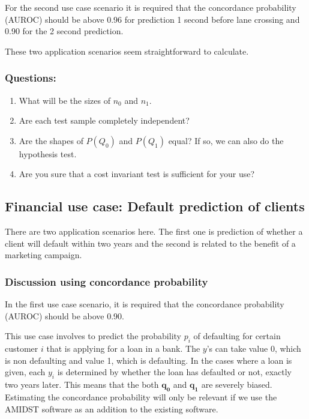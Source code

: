 \documentclass{article}
\theoremstyle{theorem}
\theoremstyle{definition}
\newcommand{\bv}[1]{\bm{#1}}
\begin{document}
For the second use case scenario it is required that the concordance probability (AUROC) should be above 0.96 for prediction 1 second before lane crossing and 0.90 for the 2 second prediction.

These two application scenarios seem straightforward to calculate.

\subsubsection*{Questions: }
\begin{enumerate}
\item What will be the sizes of $n_0$ and $n_1$.
\item Are each test sample completely independent?
\item Are the shapes of $P(Q_0)$ and $P(Q_1)$ equal? If so, we can also do the hypothesis test.
\item Are you sure that a cost invariant test is sufficient for your use?
\end{enumerate}


\subsection{Financial use case: Default prediction of clients}
\label{sec:financial}

There are two application scenarios here.  The first one is prediction of whether a client will default within two years and the second is related to the benefit of a marketing campaign.

\subsubsection*{Discussion using concordance probability}

In the first use case scenario, it is required that the concordance probability (AUROC) should be above 0.90.

This use case involves to predict the probability $p_i$ of defaulting for certain customer $i$ that is applying for a loan in a bank.  The $y$'s can take value 0, which is non defaulting and value 1, which is defaulting.  
In the cases where a loan is given, each $y_i$ is determined by whether the loan has defaulted or not, exactly two years later.  This means that the both $\bv{q_0}$ and $\bv{q_1}$ are severely biased.  Estimating the concordance probability will only be relevant if we use the AMIDST software as an addition to the existing software.
\end{document}
